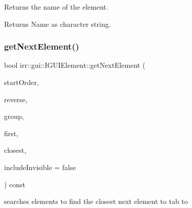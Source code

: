 Returns the name of the element. 

\begin{DoxyReturn}{Returns}
Name as character string. 
\end{DoxyReturn}
\mbox{\label{classirr_1_1gui_1_1IGUIElement_aaf461c857c9005d310635e56dc384ed4}} 
\subsubsection{\texorpdfstring{get\+Next\+Element()}{getNextElement()}\hspace{0.1cm}{\footnotesize\ttfamily [1/2]}}
{\footnotesize\ttfamily bool irr\+::gui\+::\+I\+G\+U\+I\+Element\+::get\+Next\+Element (\begin{DoxyParamCaption}\item[{\hyperlink{namespaceirr_ac66849b7a6ed16e30ebede579f9b47c6}{s32}}]{start\+Order,  }\item[{bool}]{reverse,  }\item[{bool}]{group,  }\item[{\hyperlink{classirr_1_1gui_1_1IGUIElement}{I\+G\+U\+I\+Element} $\ast$\&}]{first,  }\item[{\hyperlink{classirr_1_1gui_1_1IGUIElement}{I\+G\+U\+I\+Element} $\ast$\&}]{closest,  }\item[{bool}]{include\+Invisible = {\ttfamily false} }\end{DoxyParamCaption}) const\hspace{0.3cm}{\ttfamily [inline]}}



searches elements to find the closest next element to tab to 


